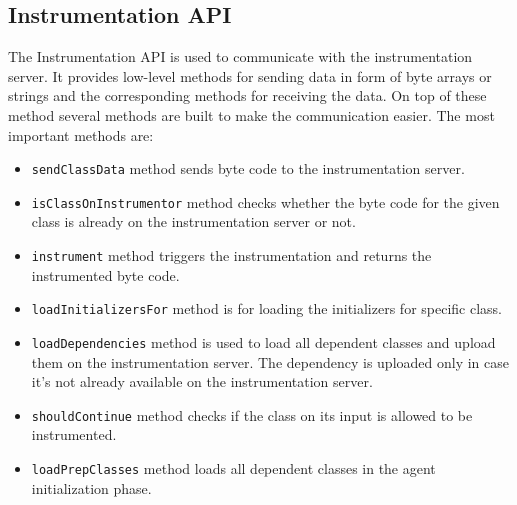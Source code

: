 \subsection{Instrumentation API}
The Instrumentation API is used to communicate with the instrumentation server. It provides low-level methods for sending data in form of byte arrays or strings and the corresponding methods for receiving the data. On top of these method several methods are built to make the communication easier. The most important methods are:
\begin{itemize}
	\item \texttt{sendClassData} method sends byte code to the instrumentation server.
	\item \texttt{isClassOnInstrumentor} method checks whether the byte code for the given class is already on the instrumentation server or not.
	\item \texttt{instrument} method triggers the instrumentation and returns the instrumented byte code.
	\item \texttt{loadInitializersFor} method is for loading the initializers for specific class.
	\item \texttt{loadDependencies} method is used to load all dependent classes and upload them on the instrumentation server. The dependency is uploaded only in case it's not already available on the instrumentation server.
	\item \texttt{shouldContinue} method checks if the class on its input is allowed to be instrumented.
	\item \texttt{loadPrepClasses} method loads all dependent classes in the agent initialization phase.
\end{itemize}

